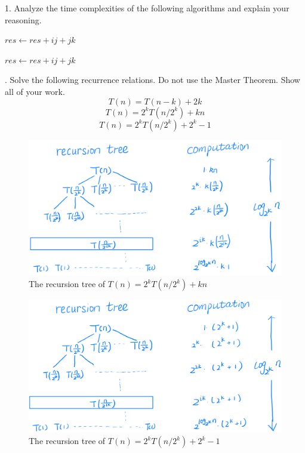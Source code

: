 \problem{}

1. Analyze the time complexities of the following algorithms and explain your reasoning.

\begin{algorithm}
\caption{}
\begin{algorithmic}
            \State $res \gets res + ij + jk$
        \EndFor
    \EndFor
\EndFor
\end{algorithmic}
\end{algorithm}


\begin{algorithm}
\caption{}
\begin{algorithmic}
            \State $res \gets res + ij + jk$
        \EndFor
    \EndFor
\EndFor
\end{algorithmic}
\end{algorithm}

. Solve the following recurrence relations. Do not use the Master Theorem. Show all of your work.
$$T(n) = T(n-k) + 2k$$
$$T(n) = 2^kT(n/2^k) + kn$$
$$T(n) = 2^kT(n/2^k) + 2^k-1$$





\begin{figure}[htbp]
    \centering
    \includegraphics[width=0.9\linewidth]{./figure/t1_22.png}
    \caption{The recursion tree of $T(n) = 2^kT(n/2^k) + kn$}
    \label{fig:t1_22}
\end{figure}


\begin{figure}[htbp]
    \centering
    \includegraphics[width=0.9\linewidth]{./figure/t1_23.png}
    \caption{The recursion tree of $T(n) = 2^kT(n/2^k) + 2^k-1$}
    \label{fig:t1_23}
\end{figure}


\newpage